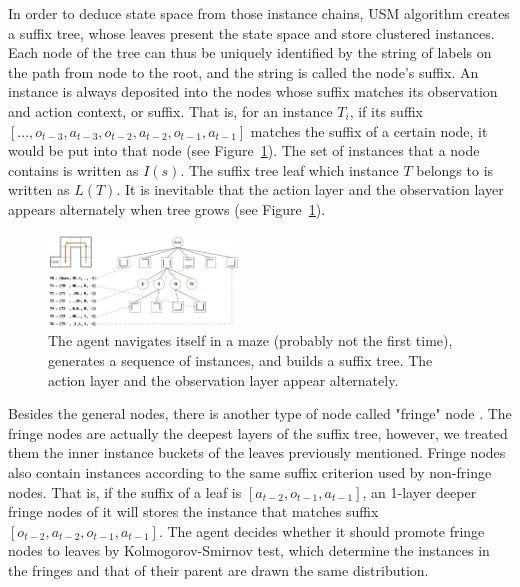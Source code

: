 \documentclass[conference]{IEEEtran}
\begin{document}
	In order to deduce state space from those instance chains, USM algorithm creates a suffix tree,
	whose leaves present the state space and store clustered instances. Each node of the tree
	can thus be uniquely identified by the string of labels on the path from node to the root,
	and the string is called the node’s suffix. An instance is always deposited into the
	nodes whose suffix matches its observation and action context, or suffix. That is,
	for an instance $T_i$, if its suffix $[..., o_{t-3}, a_{t-3}, o_{t-2}, a_{t-2}, o_{t-1}, a_{t-1}]$
	matches the suffix of a certain node, it would be put into that node (see Figure~\ref{fig:suffix tree}).
	The set of instances that a node contains is written as $I(s)$. The suffix tree leaf which
	instance $T$ belongs to is written as $L(T)$. It is inevitable that the action layer and
	the observation layer appears alternately when tree grows (see Figure~\ref{fig:suffix tree}).
	
	
	
	\begin{figure}[htbp]
		\centering
		\includegraphics[width=0.45\textwidth]{usm_sample.jpg}
		\caption{The agent navigates itself in a maze (probably not the first time), generates
			a sequence of instances, and builds a suffix tree. The action layer and
			the observation layer appear alternately.}
		\label{fig:suffix tree}
	\end{figure}
	
	
	
	Besides the general nodes, there is another type of node called "fringe" node \cite{mccallum1995instance}.
	The fringe nodes are actually the deepest layers of the suffix tree, however, we treated them
	the inner instance buckets of the leaves previously mentioned. Fringe nodes also contain
	instances according to the same suffix criterion used by non-fringe nodes. That is, 
	if the suffix of a leaf is $[a_{t-2}, o_{t-1}, a_{t-1}]$, an 1-layer deeper fringe nodes of it
	will stores the instance that matches suffix $[o_{t-2}, a_{t-2}, o_{t-1}, a_{t-1}]$. The agent decides
	whether it should promote fringe nodes to leaves by Kolmogorov-Smirnov test, which determine the
	instances in the fringes and that of their parent are drawn the same distribution.
	
\end{document}

